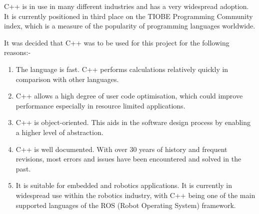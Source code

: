C++ is in use in many different industries and has a very widespread adoption. It is currently positioned in third place on the TIOBE Programming Community index, which is a measure of the popularity of programming languages worldwide. \cite{tiobe}

It was decided that C++ was to be used for this project for the following reasons:-

\begin{enumerate}
	\item The language is fast. C++ performs calculations relatively quickly in comparison with other languages.
	\item C++ allows a high degree of user code optimisation, which could improve performance especially in resource limited applications.
	\item C++ is object-oriented. This aids in the software design process by enabling a higher level of abstraction.
	\item C++ is well documented. With over 30 years of history and frequent revisions, most errors and issues have been encountered and solved in the past.
	\item It is suitable for embedded and robotics applications. It is currently in widespread use within the robotics industry, with C++ being one of the main supported languages of the ROS (Robot Operating System) framework.
\end{enumerate}